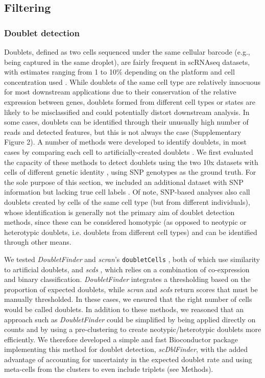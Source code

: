 \documentclass{bmcart}
\begin{document}
\subsection*{Filtering}

\subsubsection*{Doublet detection}

Doublets, defined as two cells sequenced under the same cellular barcode (e.g., being captured in the same droplet), are fairly frequent in scRNAseq datasets, with estimates ranging from 1 to 10\% depending on the platform and cell concentration used \citep{bloomEstimating2018,kangMultiplexedDemuxlet2018}. While doublets of the same cell type are relatively innocuous for most downstream applications due to their conservation of the relative expression between genes, doublets formed from different cell types or states are likely to be misclassified and could potentially distort downstream analysis. In some cases, doublets can be identified through their unusually high number of reads and detected features, but this is not always the case (Supplementary Figure 2). A number of methods were developed to identify doublets, in most cases by comparing each cell to artificially-created doublets \citep{mcginnisDoubletfinder2019, LunScran2016, BaisScds2019}. We first evaluated the capacity of these methods to detect doublets using the two 10x datasets with cells of different genetic identity \citep{tianMixology2018}, using SNP genotypes as the ground truth. For the sole purpose of this section, we included an additional dataset with SNP information but lacking true cell labels \citep{kangMultiplexedDemuxlet2018}. Of note, SNP-based analyses also call doublets created by cells of the same cell type (but from different individuals), whose identification is generally not the primary aim of doublet detection methods, since these can be considered homotypic (as opposed to neotypic or heterotypic doublets, i.e. doublets from different cell types) and can be identified through other means.

We tested \textit{DoubletFinder} \citep{mcginnisDoubletfinder2019} and \textit{scran}'s \texttt{doubletCells} \citep{LunScran2016}, both of which use similarity to artificial doublets, and \textit{scds} \citep{BaisScds2019}, which relies on a combination of co-expression and binary classification. \textit{DoubletFinder} integrates a thresholding based on the proportion of expected doublets, while \textit{scran} and \textit{scds} return scores that must be manually thresholded. In these cases, we ensured that the right number of cells would be called doublets. In addition to these methods, we reasoned that an approach such as \textit{DoubletFinder} could be simplified by being applied directly on counts and by using a pre-clustering to create neotypic/heterotypic doublets more efficiently. We therefore developed a simple and fast Bioconductor package implementing this method for doublet detection, \textit{scDblFinder}, with the added advantage of accounting for uncertainty in the expected doublet rate and using meta-cells from the clusters to even include triplets (see Methods).
\end{document}
